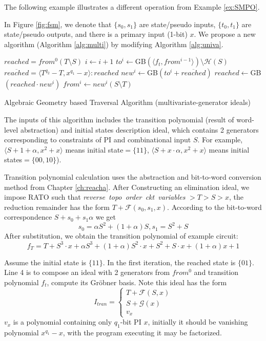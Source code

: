 The following example illustrates a different operation from Example \ref{ex:SMPO}.
\begin{Example}
In Figure \ref{fig:fsm}, we denote that
$\{s_0, s_1\}$ are state/pseudo inputs, $\{t_0,t_1\}$ are state/pseudo outputs, and there is a primary input (1-bit) 
$x$. We propose a new algorithm (Algorithm \ref{alg:multi}) by modifying Algorithm \ref{alg:univa}.

\begin{algorithm}[hbt]
\SetAlgoNoLine
\LinesNumbered
  $reached = from^0(T\setminus S)$\;
  {
  	$i \gets i + 1$\;
	$to^i \gets$GB$(\langle f_t, from^{i-1}\rangle) \setminus \mathcal H(S)$\;
	$\overline{reached} = \langle T^{q_2}-T, x^{q_1} - x \rangle : reached$\;
	$new^i \gets $GB$(to^i + \overline{reached})$\;
  	$reached \gets $GB$( reached \cdot new^i)$\;
	$from^i \gets new^i(S\setminus T)$\;
  }
\caption {Algebraic Geometry based Traversal Algorithm (multivariate-generator ideals)}\label{alg:multi}
\end{algorithm}

The inputs of this algorithm includes the transition polynomial (result of word-level abstraction) and initial 
states description ideal, which contains 2 generators corresponding to constraints of PI and combinational input $S$. 
For example, $\langle S+1+\alpha, x^2+x\rangle$ means initial state$=\{11\}$,
$\langle S+x\cdot\alpha, x^2+x\rangle$ means initial states$=\{00,10\}$).

Transition polynomial calculation uses the abstraction and bit-to-word conversion method from 
Chapter \ref{ch:reacha}. After Constructing
an elimination ideal, we impose RATO such that \textit{reverse\ topo\ order\ ckt\ variables }$> T > S > x$, the reduction
remainder has the form $T+\mathcal F(s_0,s_1,x)$. According to the bit-to-word correspondence $S+s_0+s_1\alpha$ we get
$$s_0 = \alpha S^2+ (1+\alpha)S, s_1 = S^2+S$$
After substitution, we obtain the transition polynomial of example circuit: 
$$f_T = T+S^3\cdot x+\alpha S^3+(1+\alpha)S^2\cdot x+S^2+S\cdot x+(1+\alpha)x+1$$

Assume the initial state is $\{11\}$. In the first iteration, the reached state is $\{01\}$. Line 4 is to compose an
ideal with 2 generators from $from^0$ and transition polynomial $f_t$, compute its Gr\"obner basis. Note this ideal
has the form
\begin{equation}
I_{tran} = \left\{
             \begin{array}{c}
             T+\mathcal F(S,x) \\
             S + \mathcal G(x) \\
             v_x
             \end{array}  
        \right.
\end {equation}
$v_x$ is a polynomial containing only $q_1$-bit PI $x$, initially it should be vanishing polynomial $x^{q_1}-x$, 
with the program executing it may be factorized.


\end{Example}
